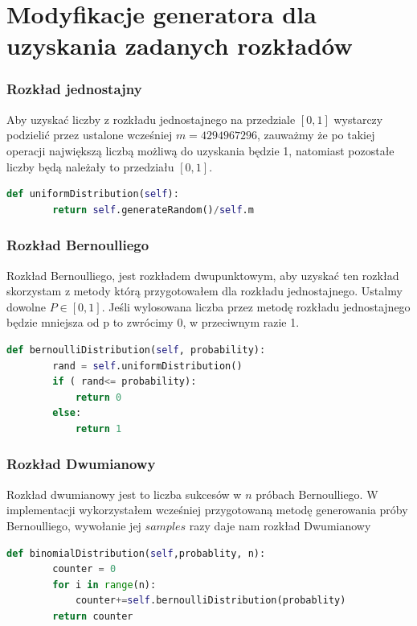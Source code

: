 \documentclass[9pt]{beamer}
\begin{document}
\section{Modyfikacje generatora dla uzyskania zadanych rozkładów}
\begin{frame}[containsverbatim]
  \frametitle{Rozkład jednostajny}
  Aby uzyskać liczby z rozkładu jednostajnego na przedziale $[0,1]$ wystarczy podzielić przez ustalone wcześniej $m=4294967296$, zauważmy że po takiej operacji największą liczbą możliwą do uzyskania będzie 1, natomiast pozostałe liczby będą należały to przedziału $[0,1]$.
  \begin{lstlisting}[language=Python, caption=Metoda rozkładu jednostajnego]
    def uniformDistribution(self):
        return self.generateRandom()/self.m
    \end{lstlisting}
\end{frame}
\begin{frame}[containsverbatim]
  \frametitle{Rozkład Bernoulliego}
  Rozkład Bernoulliego, jest rozkładem dwupunktowym, aby uzyskać ten rozkład skorzystam z metody którą przygotowałem dla rozkładu jednostajnego. Ustalmy dowolne $P\in [0,1]$. Jeśli wylosowana liczba przez metodę rozkładu jednostajnego będzie mniejsza od p to zwrócimy 0, w przeciwnym razie 1.
  \begin{lstlisting}[language=Python, caption=Metoda rozkładu Bernoulliego]
    def bernoulliDistribution(self, probability):
        rand = self.uniformDistribution()
        if ( rand<= probability):
            return 0
        else:
            return 1
    \end{lstlisting}
\end{frame}
\begin{frame}[containsverbatim]
  \frametitle{Rozkład Dwumianowy}
  Rozkład dwumianowy jest to liczba sukcesów w $n$ próbach Bernoulliego. W implementacji wykorzystałem wcześniej przygotowaną metodę generowania próby Bernoulliego, wywołanie jej $samples$ razy daje nam rozkład Dwumianowy
  \begin{lstlisting}[language=Python, caption=Metoda rozkładu Dwumianowego]
    def binomialDistribution(self,probablity, n):
        counter = 0
        for i in range(n):
            counter+=self.bernoulliDistribution(probablity)
        return counter
    \end{lstlisting}
\end{frame}
\end{document}
